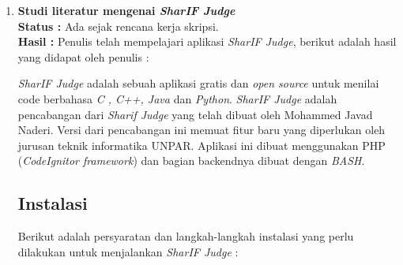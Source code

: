 \documentclass[a4paper,twoside]{article}
\begin{document}
\begin{enumerate}
		\subsubsection*{Kriteria Sukses 4.1.2 Name, Role, Value}
		\label{subsubsec:kriteria_4.1.2}
		(Level A) \\
		
		Untuk semua komponen antarmuka pengguna (termasuk tetapi tidak terbatas pada: elemen formulir, tautan, dan komponen yang dihasilkan oleh skrip), nama dan peran dapat ditentukan secara pemrograman; \textit{states}, properti, dan nilai-nilai yang dapat diatur oleh pengguna dapat diatur secara terprogram; dan pemberitahuan perubahan pada \textit{item-item} ini tersedia untuk agen pengguna, termasuk teknologi bantu.
		
		\subsubsection*{Kriteria Sukses 4.1.3 Status Messages}
		\label{subsubsec:kriteria_4.1.3}
		(Level AA) \\
		
		Dalam konten yang diimplementasikan menggunakan bahasa \textit{markup}, pesan status dapat ditentukan secara terprogram melalui peran atau sifat sedemikian rupa sehingga dapat disajikan kepada pengguna dengan teknologi bantuan tanpa menerima fokus.
		
		\item \textbf{Studi literatur mengenai \textit{SharIF Judge}}\\
		{\bf Status :} Ada sejak rencana kerja skripsi.\\
		{\bf Hasil :} Penulis telah mempelajari aplikasi \textit{SharIF Judge}, berikut adalah hasil yang didapat oleh penulis :
		
		\textit{SharIF Judge} adalah sebuah aplikasi gratis dan \textit{open source} untuk menilai code berbahasa \textit{C , C++, Java} dan \textit{Python}. \textit{SharIF Judge} adalah pencabangan dari \textit{Sharif Judge} yang telah dibuat oleh Mohammed Javad Naderi. Versi dari pencabangan ini memuat fitur baru yang diperlukan oleh jurusan teknik informatika UNPAR. Aplikasi ini dibuat menggunakan PHP (\textit{CodeIgnitor framework}) dan bagian backendnya dibuat dengan \textit{BASH}.
		
		\subsection*{Instalasi}
		\label{subsec:instalasi}
		Berikut adalah persyaratan dan langkah-langkah instalasi yang perlu dilakukan untuk menjalankan \textit{SharIF Judge} :
		

\end{enumerate}
\end{document}
